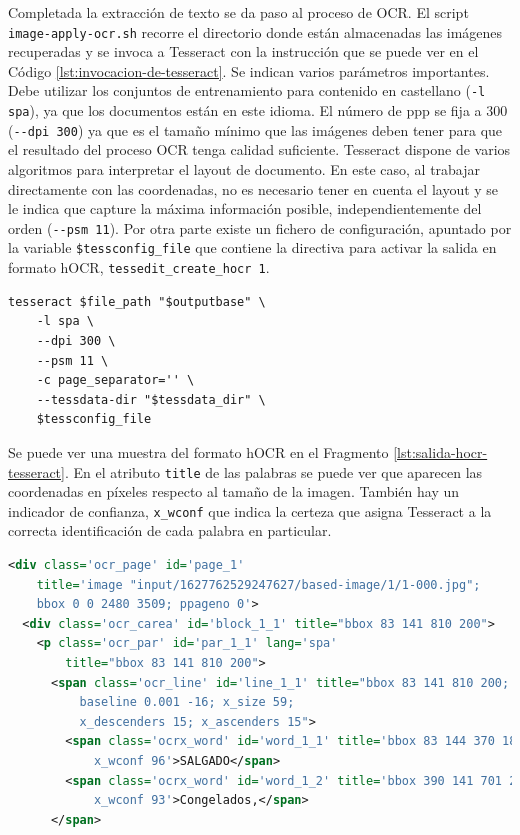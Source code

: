 Completada la extracción de texto se da paso al proceso de OCR. El script \verb|image-apply-ocr.sh| recorre el directorio donde están almacenadas las imágenes recuperadas y se invoca a Tesseract con la instrucción que se puede ver en el Código \ref{lst:invocacion-de-tesseract}. Se indican varios parámetros importantes. Debe utilizar los conjuntos de entrenamiento para contenido en castellano (\verb|-l spa|), ya que los documentos están en este idioma. El número de \acrlong{ppp} se fija a 300 (\verb|--dpi 300|) ya que es el tamaño mínimo que las imágenes deben tener para que el resultado del proceso OCR tenga calidad suficiente. Tesseract dispone de varios algoritmos para interpretar el layout de documento. En este caso, al trabajar directamente con las coordenadas, no es necesario tener en cuenta el layout y se le indica que capture la máxima información posible, independientemente del orden (\verb|--psm 11|). Por otra parte existe un fichero de configuración, apuntado por la variable \verb|$tessconfig_file| que contiene la directiva para activar la salida en formato hOCR, \verb|tessedit_create_hocr 1|.

\begin{lstlisting}[language=XML,caption={Invocación de Tesseract utilizada en el proyecto},label=lst:invocacion-de-tesseract]
tesseract $file_path "$outputbase" \
    -l spa \
    --dpi 300 \
    --psm 11 \
    -c page_separator='' \
    --tessdata-dir "$tessdata_dir" \
    $tessconfig_file
\end{lstlisting}

Se puede ver una muestra del formato hOCR en el Fragmento \ref{lst:salida-hocr-tesseract}. En el atributo \verb|title| de las palabras se puede ver que aparecen las coordenadas en píxeles respecto al tamaño de la imagen. También hay un indicador de confianza, \verb|x_wconf| que indica la certeza que asigna Tesseract a la correcta identificación de cada palabra en particular.

\begin{lstlisting}[language=XML,caption={Fragmento de la salida hOCR de Tesseract},label=lst:salida-hocr-tesseract]
<div class='ocr_page' id='page_1' 
    title='image "input/1627762529247627/based-image/1/1-000.jpg"; 
    bbox 0 0 2480 3509; ppageno 0'>
  <div class='ocr_carea' id='block_1_1' title="bbox 83 141 810 200">
    <p class='ocr_par' id='par_1_1' lang='spa' 
        title="bbox 83 141 810 200">
      <span class='ocr_line' id='line_1_1' title="bbox 83 141 810 200; 
          baseline 0.001 -16; x_size 59; 
          x_descenders 15; x_ascenders 15">
        <span class='ocrx_word' id='word_1_1' title='bbox 83 144 370 185; 
            x_wconf 96'>SALGADO</span>
        <span class='ocrx_word' id='word_1_2' title='bbox 390 141 701 200; 
            x_wconf 93'>Congelados,</span>
      </span>
\end{lstlisting}

